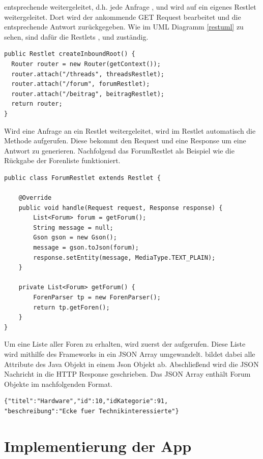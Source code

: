 entsprechende  weitergeleitet, d.h. jede Anfrage 
,  und  wird auf ein eigenes Restlet
weitergeleitet. Dort wird der ankommende GET Request bearbeitet und die
entsprechende Antwort zurückgegeben. Wie im UML Diagramm \ref{restuml} zu sehen,
sind dafür die Restlets ,  und
 zuständig. 
\begin{lstlisting}[caption=Routing der Restlets, label=routing]
public Restlet createInboundRoot() {
  Router router = new Router(getContext());
  router.attach("/threads", threadsRestlet);
  router.attach("/forum", forumRestlet);
  router.attach("/beitrag", beitragRestlet);
  return router;
}
\end{lstlisting}
Wird eine Anfrage an ein Restlet weitergeleitet, wird im Restlet automatisch die
Methode  aufgerufen. Diese bekommt den Request und eine
Response um eine Antwort zu generieren. Nachfolgend das ForumRestlet als
Beispiel wie die Rückgabe der Forenliste funktioniert.
\begin{lstlisting}[caption=Funktionsweise des ForumRestlet, label=forumrestlet]
public class ForumRestlet extends Restlet {

	@Override
    public void handle(Request request, Response response) {
		List<Forum> forum = getForum();
        String message = null;
        Gson gson = new Gson();
        message = gson.toJson(forum);
        response.setEntity(message, MediaType.TEXT_PLAIN);
    }
    
	private List<Forum> getForum() {
		ForenParser tp = new ForenParser();
		return tp.getForen();
	}
}
\end{lstlisting}
Um eine Liste aller Foren zu erhalten, wird zuerst der 
aufgerufen. Diese Liste wird mithilfe des Frameworks  in ein
JSON Array umgewandelt.  bildet dabei alle Attribute des Java
Objekt in einem Json Objekt ab. Abschließend wird die JSON Nachricht in die HTTP
Response geschrieben. Das JSON Array enthält Forum Objekte im
nachfolgenden Format. 
\begin{lstlisting}[caption=Format der Forum Objekte,label=jsonforum] 
{"titel":"Hardware","id":10,"idKategorie":91,
"beschreibung":"Ecke fuer Technikinteressierte"}
\end{lstlisting}
\section{Implementierung der App}